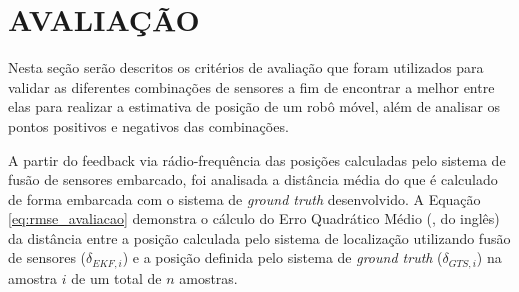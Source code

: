 \documentclass[acronym, symbols, table, deposito]{fei}
\begin{document}
%		
%		
%		
%		
		
	\section{AVALIAÇÃO}\label{sec:metodologia_avaliacao}
	
		Nesta seção serão descritos os critérios de avaliação que foram utilizados para validar as diferentes combinações de sensores a fim de encontrar a melhor entre elas para realizar a estimativa de posição de um robô móvel, além de analisar os pontos positivos e negativos das combinações.
		
		A partir do feedback via rádio-frequência das posições calculadas pelo sistema de fusão de sensores embarcado, foi analisada a distância média do que é calculado de forma embarcada com o sistema de \textit{ground truth} desenvolvido. A Equação \eqref{eq:rmse_avaliacao} demonstra o cálculo do Erro Quadrático Médio (, do inglês) da distância entre a posição calculada pelo sistema de localização utilizando fusão de sensores ($\delta_{EKF, i}$) e a posição definida pelo sistema de \textit{ground truth} ($\delta_{GTS, i}$) na amostra $i$ de um total de $n$ amostras.
		
\end{document}
